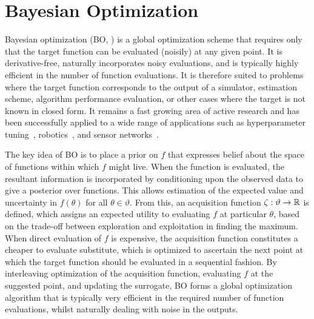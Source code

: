 
\section{Bayesian Optimization}
\label{sec:opt:BO}

Bayesian optimization (BO, \cite{movckus1975bayesian,jones1998efficient,osborne2009gaussian,brochu2010tutorial,shahriari2016taking})  is a 
global optimization scheme that requires only that the target
function can be evaluated (noisily) at any given point.  It is derivative-free,
naturally incorporates noisy evaluations, and is typically highly efficient 
in the number of function evaluations.  It is therefore suited to
problems where the target function corresponds to the output of a simulator,
estimation scheme, algorithm performance evaluation, or other cases where
the target is not known in closed form.  It remains a fast growing area of
active research and has been successfully applied to 
a wide range of applications such as hyperparameter tuning~\citep{snoek2012practical},
robotics~\citep{calandra2016bayesian}, and sensor networks~\citep{garnett2010bayesian}.

The key idea of BO is to place a prior on $f$ that expresses belief about the space of functions within which $f$ might live.  When the function is evaluated, the resultant information is incorporated by conditioning upon the observed data to give a posterior over functions.  
This allows estimation of the expected value and uncertainty in $f\left(\theta\right)$ for all $\theta \in \vartheta$.  
From this, an acquisition function $\zeta : \vartheta \rightarrow \mathbb{R}$ is defined, which assigns an expected utility to evaluating $f$ at particular $\theta$, based on the trade-off between exploration and exploitation in finding the maximum.  When direct evaluation of $f$ is expensive, the acquisition function constitutes a cheaper to evaluate substitute, which is optimized to ascertain the next point at which the target function should be evaluated in a sequential fashion.  By interleaving optimization of the acquisition function, evaluating $f$ at the suggested point, and updating the surrogate, BO forms a global optimization algorithm that is typically very efficient in the required number of function evaluations, whilst naturally dealing with noise in the outputs.  

